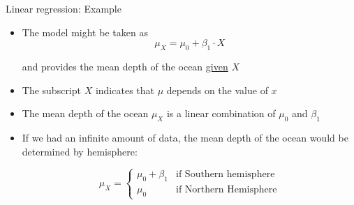 \documentclass[10pt,handout]{beamer}\usepackage[]{graphicx}\usepackage[]{color}
\begin{document}
\begin{frame}{Linear regression: Example}
	
	\begin{itemize}
		\setlength\itemsep{1.7em}
		\item The model might be taken as 
		$$
		\mu_X = \mu_0 + \beta_1 \cdot X 
		$$
		
		and provides the mean depth of the ocean \underline{given} $X$ 
		
		\item The subscript $X$ indicates that $\mu$ depends on the value of $x$
		
		\item The mean depth of the ocean $\mu_X$ is a linear combination of $\mu_0$ and $\beta_1$ 
		
			
		\item If we had an infinite amount of data, the mean depth of the ocean would be determined by hemisphere:
		
		$$
		\mu_X = \begin{cases}
		\mu_0 + \beta_1  &  \textrm{if Southern hemisphere}\\
		\mu_0  &  \textrm{if Northern Hemisphere}
		\end{cases}
		$$
		
	\end{itemize}
	
\end{frame}
\end{document}
